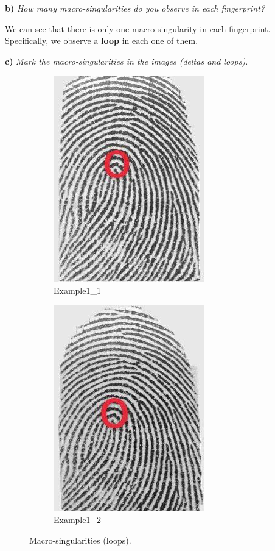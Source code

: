 \documentclass[11pt]{article}
\begin{document}
\textbf{b) } \emph{How many macro-singularities do you observe in each fingerprint?}

We can see that there is only one macro-singularity in each fingerprint. Specifically, we observe a \textbf{loop} in each one of them.

\textbf{c) } \emph{Mark the macro-singularities in the images (deltas and loops).}

\begin{figure}[h!]
  \centering
       \begin{subfigure}[t]{0.45\textwidth}
         \centering
         \includegraphics[scale=0.7]{img/msing_1.jpg}
         \caption{Example1\_1}
     \end{subfigure}%
     \quad
     \begin{subfigure}[t]{0.45\textwidth}
         \centering
         \includegraphics[scale=0.7]{img/msing_2.jpg}
         \caption{Example1\_2}
     \end{subfigure}
    \caption{Macro-singularities (loops).}
\end{figure}
\end{document}
